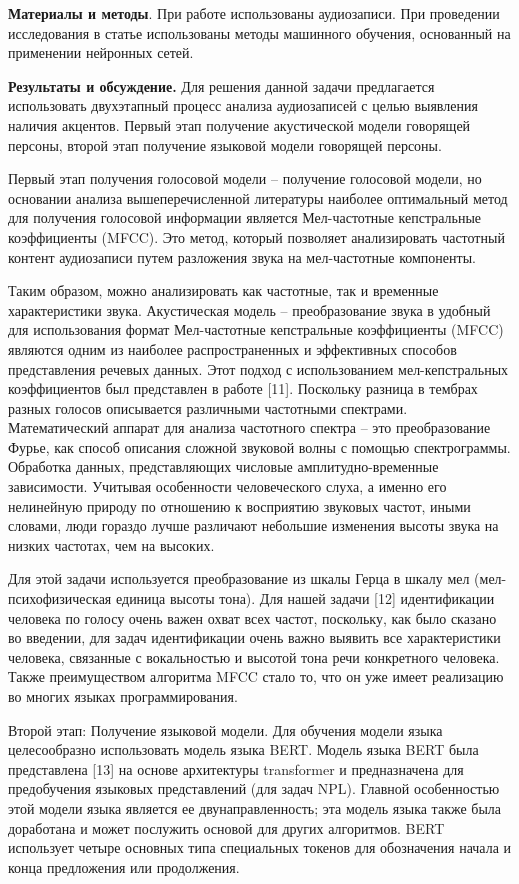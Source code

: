 {\bfseries Материалы и методы}. При работе использованы аудиозаписи. При
проведении исследования в статье использованы методы машинного обучения,
основанный на применении нейронных сетей.

{\bfseries Результаты и обсуждение.} Для решения данной задачи предлагается
использовать двухэтапный процесс анализа аудиозаписей с целью выявления
наличия акцентов. Первый этап получение акустической модели говорящей
персоны, второй этап получение языковой модели говорящей персоны.

Первый этап получения голосовой модели -- получение голосовой модели, но
основании анализа вышеперечисленной литературы наиболее оптимальный
метод для получения голосовой информации является Мел-частотные
кепстральные коэффициенты (MFCC). Это метод, который позволяет
анализировать частотный контент аудиозаписи путем разложения звука на
мел-частотные компоненты.

Таким образом, можно анализировать как частотные, так и временные
характеристики звука. Акустическая модель -- преобразование звука в
удобный для использования формат Мел-частотные кепстральные коэффициенты
(MFCC) являются одним из наиболее распространенных и эффективных
способов представления речевых данных. Этот подход с использованием
мел-кепстральных коэффициентов был представлен в работе {[}11{]}.
Поскольку разница в тембрах разных голосов описывается различными
частотными спектрами. Математический аппарат для анализа частотного
спектра -- это преобразование Фурье, как способ описания сложной
звуковой волны с помощью спектрограммы. Обработка данных, представляющих
числовые амплитудно-временные зависимости. Учитывая особенности
человеческого слуха, а именно его нелинейную природу по отношению к
восприятию звуковых частот, иными словами, люди гораздо лучше различают
небольшие изменения высоты звука на низких частотах, чем на высоких.

Для этой задачи используется преобразование из шкалы Герца в шкалу мел
(мел-психофизическая единица высоты тона). Для нашей задачи {[}12{]}
идентификации человека по голосу очень важен охват всех частот,
поскольку, как было сказано во введении, для задач идентификации очень
важно выявить все характеристики человека, связанные с вокальностью и
высотой тона речи конкретного человека. Также преимуществом алгоритма
MFCC стало то, что он уже имеет реализацию во многих языках
программирования.

Второй этап: Получение языковой модели. Для обучения модели языка
целесообразно использовать модель языка BERT. Модель языка BERT была
представлена {[}13{]} на основе архитектуры transformer и предназначена
для предобучения языковых представлений (для задач NPL). Главной
особенностью этой модели языка является ее двунаправленность; эта модель
языка также была доработана и может послужить основой для других
алгоритмов. BERT использует четыре основных типа специальных токенов для
обозначения начала и конца предложения или продолжения.

